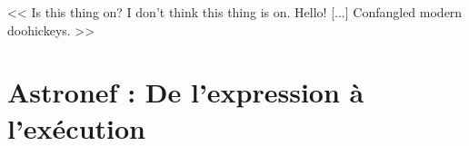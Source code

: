 \begin{savequote}[6cm]
<< Is this thing on? I don't think this thing is on. Hello! [...] Confangled modern doohickeys. >>
\end{savequote}

\chapter{Astronef : De l'expression à l'exécution}\label{chap:contrib:astronef}
\chaptertoc

\lstset{language=PrologAstral}





